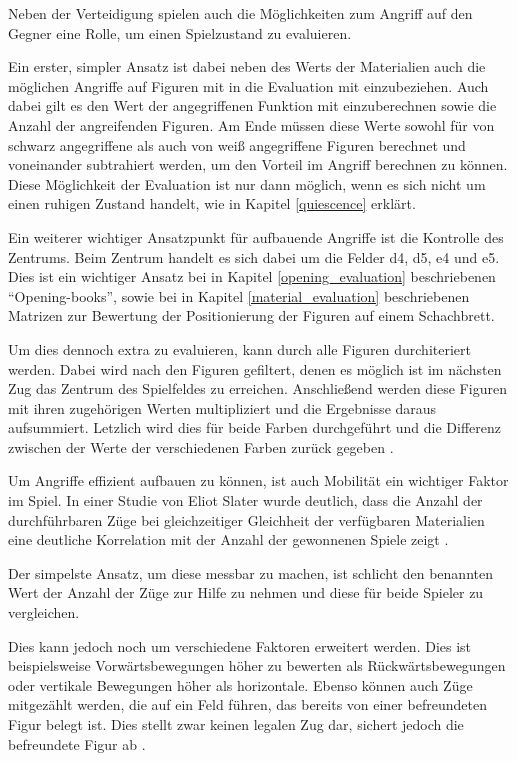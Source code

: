 Neben der Verteidigung spielen auch die Möglichkeiten zum Angriff auf den Gegner eine Rolle, um einen Spielzustand zu evaluieren.

Ein erster, simpler Ansatz ist dabei neben des Werts der Materialien auch die möglichen Angriffe auf Figuren mit in die Evaluation mit einzubeziehen. Auch dabei gilt es den Wert der angegriffenen Funktion mit einzuberechnen sowie die Anzahl der angreifenden Figuren. Am Ende müssen diese Werte sowohl für von schwarz angegriffene als auch von weiß angegriffene Figuren berechnet und voneinander subtrahiert werden, um den Vorteil im Angriff berechnen zu können. Diese Möglichkeit der Evaluation ist nur dann möglich, wenn es sich nicht um einen ruhigen Zustand handelt, wie in Kapitel \ref{quiescence} erklärt. 

Ein weiterer wichtiger Ansatzpunkt für aufbauende Angriffe ist die Kontrolle des Zentrums. Beim Zentrum handelt es sich dabei um die Felder d4, d5, e4 und e5. Dies ist ein wichtiger Ansatz bei in Kapitel \ref{opening_evaluation} beschriebenen ``Opening-books'', sowie bei in Kapitel \ref{material_evaluation} beschriebenen Matrizen zur Bewertung der Positionierung der Figuren auf einem Schachbrett. 

Um dies dennoch extra zu evaluieren, kann durch alle Figuren durchiteriert werden. Dabei wird nach den Figuren gefiltert, denen es möglich ist im nächsten Zug das Zentrum des Spielfeldes zu erreichen. Anschließend werden diese Figuren mit ihren zugehörigen Werten multipliziert und die Ergebnisse daraus aufsummiert. Letzlich wird dies für beide Farben durchgeführt und die Differenz zwischen der Werte der verschiedenen Farben zurück gegeben \cite{O.V.2019}.


Um Angriffe effizient aufbauen zu können, ist auch Mobilität ein wichtiger Faktor im Spiel. In einer Studie von Eliot Slater wurde deutlich, dass die Anzahl der durchführbaren Züge bei gleichzeitiger Gleichheit der verfügbaren Materialien eine deutliche Korrelation mit der Anzahl der gewonnenen Spiele zeigt \cite{Slater1988}.

Der simpelste Ansatz, um diese messbar zu machen, ist schlicht den benannten Wert der Anzahl der Züge zur Hilfe zu nehmen und diese für beide Spieler zu vergleichen.

Dies kann jedoch noch um verschiedene Faktoren erweitert werden. Dies ist beispielsweise Vorwärtsbewegungen höher zu bewerten als Rückwärtsbewegungen oder vertikale Bewegungen höher als horizontale. Ebenso können auch Züge mitgezählt werden, die auf ein Feld führen, das bereits von einer befreundeten Figur belegt ist. Dies stellt zwar keinen legalen Zug dar, sichert jedoch die befreundete Figur ab \cite{O.V:2019}.

